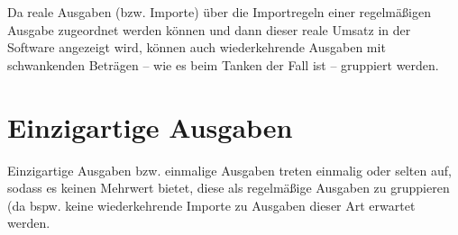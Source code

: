 Da reale Ausgaben (bzw. Importe) über die Importregeln einer regelmäßigen Ausgabe zugeordnet werden können und dann dieser reale Umsatz in der Software angezeigt wird, können auch wiederkehrende Ausgaben mit schwankenden Beträgen -- wie es beim Tanken der Fall ist -- gruppiert werden.


\section{Einzigartige Ausgaben}

Einzigartige Ausgaben bzw. einmalige Ausgaben treten einmalig oder selten auf, sodass es keinen Mehrwert bietet, diese als regelmäßige Ausgaben zu gruppieren (da bspw. keine wiederkehrende Importe zu Ausgaben dieser Art erwartet werden.